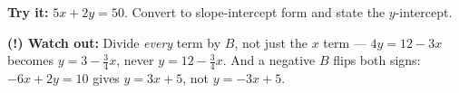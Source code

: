 \documentclass[12pt]{article}
\begin{document}
\begin{tryitbox}
\textbf{Try it:} \quad $5x + 2y = 50$. Convert to slope-intercept form and state the
$y$-intercept.\\[2pt]
\end{tryitbox}

\begin{watchoutbox}
\textbf{(!) Watch out:} Divide \emph{every} term by $B$, not just the $x$ term ---
$4y = 12 - 3x$ becomes $y = 3 - \tfrac{3}{4}x$, never $y = 12 - \tfrac{3}{4}x$. And a
negative $B$ flips both signs: $-6x + 2y = 10$ gives $y = 3x + 5$, not $y = -3x + 5$.
\end{watchoutbox}
\end{document}
